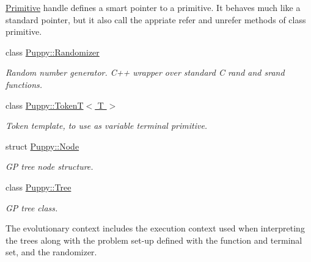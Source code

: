 \begin{DoxyCompactItemize}
\begin{DoxyCompactList}
\hyperlink{classPuppy_1_1Primitive}{Primitive} handle defines a smart pointer to a primitive. It behaves much like a standard pointer, but it also call the appriate refer and unrefer methods of class primitive. \end{DoxyCompactList}\item 
class \hyperlink{classPuppy_1_1Randomizer}{Puppy\+::\+Randomizer}
\begin{DoxyCompactList}\small\item\em Random number generator. C++ wrapper over standard C rand and srand functions. \end{DoxyCompactList}\item 
class \hyperlink{classPuppy_1_1TokenT}{Puppy\+::\+Token\+T$<$ T $>$}
\begin{DoxyCompactList}\small\item\em Token template, to use as variable terminal primitive. \end{DoxyCompactList}\item 
struct \hyperlink{structPuppy_1_1Node}{Puppy\+::\+Node}
\begin{DoxyCompactList}\small\item\em G\+P tree node structure. \end{DoxyCompactList}\item 
class \hyperlink{classPuppy_1_1Tree}{Puppy\+::\+Tree}
\begin{DoxyCompactList}\small\item\em G\+P tree class.

The evolutionary context includes the execution context used when interpreting the trees along with the problem set-\/up defined with the function and terminal set, and the randomizer. \end{DoxyCompactList}\end{DoxyCompactItemize}
